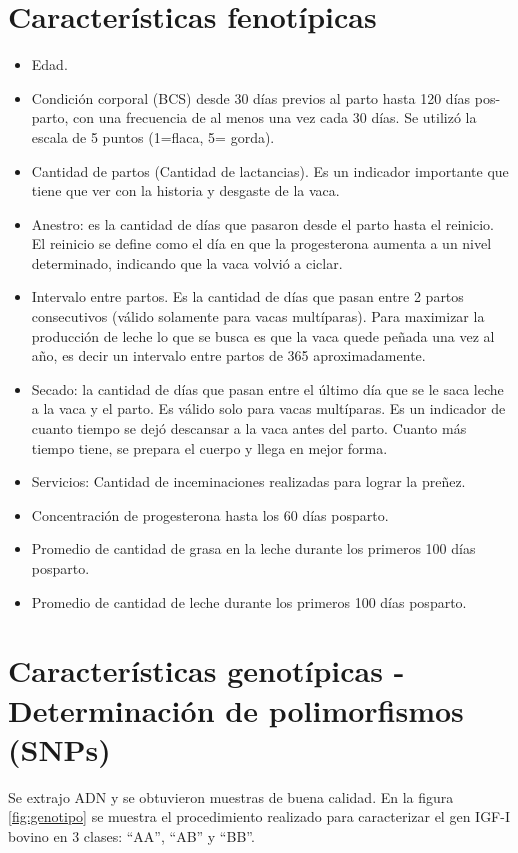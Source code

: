 \documentclass[12pt,a4paper,titlepage]{report}
\begin{document}
\section{Características fenotípicas}
\begin{itemize}
	\item Edad.
	\item Condición corporal (BCS) desde 30 días previos al parto hasta 120 días pos-parto, con una frecuencia de al menos una vez cada 30 días. Se utilizó la escala de 5 puntos (1=flaca, 5= gorda).
	\item Cantidad de partos (Cantidad de lactancias). Es un indicador importante que tiene que ver con la historia y desgaste de la vaca.
	\item Anestro: es la cantidad de días que pasaron desde el parto hasta el reinicio. El reinicio se define como el día en que la progesterona aumenta a un nivel determinado, indicando que la vaca volvió a ciclar.
	\item Intervalo entre partos. Es la cantidad de días que pasan entre 2 partos consecutivos (válido solamente para vacas multíparas). Para maximizar la producción de leche lo que se busca es que la vaca quede peñada una vez al año, es decir un intervalo entre partos de 365 aproximadamente.
	\item Secado: la cantidad de días que pasan entre el último día que se le saca leche a la vaca y el parto. Es válido solo para vacas multíparas. Es un indicador de cuanto tiempo se dejó descansar a la vaca antes del parto. Cuanto más tiempo tiene, se prepara el cuerpo y llega en mejor forma.
	\item Servicios: Cantidad de inceminaciones realizadas para lograr la preñez.
	\item Concentración de progesterona hasta los 60 días posparto.
	\item Promedio de cantidad de grasa en la leche durante los primeros 100 días posparto.
	\item Promedio de cantidad de leche durante los primeros 100 días posparto.
\end{itemize}

\section{Características genotípicas - Determinación de polimorfismos (SNPs)}
Se extrajo ADN y se obtuvieron muestras de buena calidad. En la figura \ref{fig:genotipo} se muestra el procedimiento realizado para caracterizar el gen IGF-I bovino en 3 clases: ``AA'', ``AB'' y ``BB''. 
\end{document}
